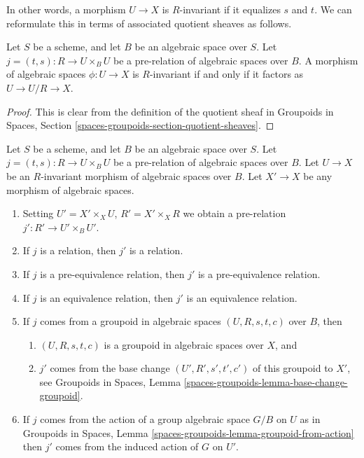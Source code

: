 \noindent
In other words, a morphism $U \to X$ is $R$-invariant if it equalizes
$s$ and $t$.  We can reformulate this in terms of associated quotient
sheaves as follows.

\begin{lemma}
\label{lemma-invariant}
Let $S$ be a scheme, and let $B$ be an algebraic space over $S$.
Let $j = (t, s) : R \to U \times_B U$ be a pre-relation of algebraic
spaces over $B$. A morphism of algebraic spaces $\phi : U \to X$ is
$R$-invariant if and only if it factors as
$U \to U/R \to X$.
\end{lemma}

\begin{proof}
This is clear from the definition of the quotient sheaf in
Groupoids in Spaces, Section \ref{spaces-groupoids-section-quotient-sheaves}.
\end{proof}

\begin{lemma}
\label{lemma-base-change-on-invariant}
Let $S$ be a scheme, and let $B$ be an algebraic space over $S$.
Let $j = (t, s) : R \to U \times_B U$ be a pre-relation of algebraic
spaces over $B$. Let $U \to X$ be an $R$-invariant morphism of algebraic
spaces over $B$. Let $X' \to X$ be any morphism of algebraic spaces.
\begin{enumerate}
\item Setting $U' = X' \times_X U$, $R' = X' \times_X R$ we obtain
a pre-relation $j' : R' \to U' \times_B U'$.
\item If $j$ is a relation, then $j'$ is a relation.
\item If $j$ is a pre-equivalence relation, then $j'$ is a
pre-equivalence relation.
\item If $j$ is an equivalence relation, then $j'$ is an equivalence
relation.
\item If $j$ comes from a groupoid in algebraic spaces
$(U, R, s, t, c)$ over $B$, then
\begin{enumerate}
\item $(U, R, s, t, c)$ is a groupoid in algebraic spaces over $X$, and
\item $j'$ comes from the base change $(U', R', s', t', c')$
of this groupoid to $X'$, see
Groupoids in Spaces, Lemma
\ref{spaces-groupoids-lemma-base-change-groupoid}.
\end{enumerate}
\item If $j$ comes from the action of a group algebraic space $G/B$ on $U$
as in Groupoids in Spaces, Lemma
\ref{spaces-groupoids-lemma-groupoid-from-action}
then $j'$ comes from the induced action of $G$ on $U'$.
\end{enumerate}
\end{lemma}

